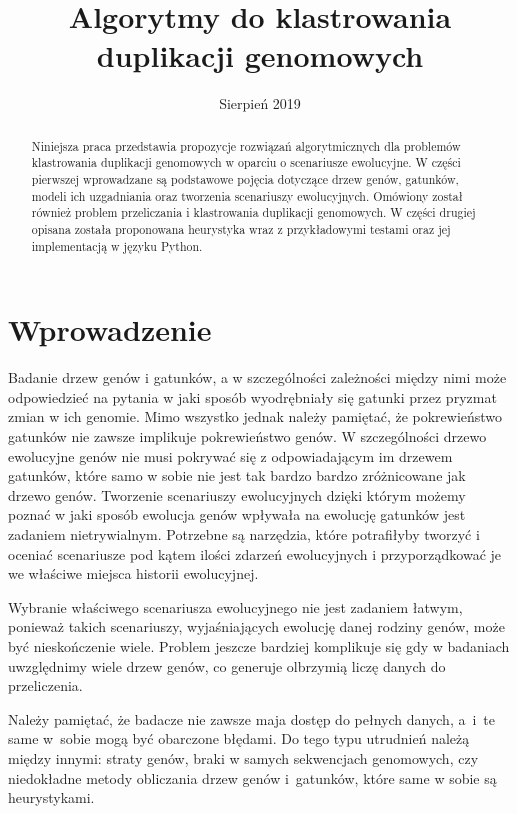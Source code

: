 \documentclass[licencjacka]{pracamgr}
\title{Algorytmy do klastrowania duplikacji genomowych}
\date{Sierpień 2019}
\begin{document}
\maketitle


\begin{abstract}
   Niniejsza praca przedstawia propozycje rozwiązań algorytmicznych dla problemów klastrowania duplikacji genomowych w oparciu o scenariusze ewolucyjne. W części pierwszej wprowadzane są podstawowe pojęcia dotyczące drzew genów, gatunków, modeli ich uzgadniania oraz tworzenia scenariuszy ewolucyjnych. Omówiony został również problem przeliczania i klastrowania duplikacji genomowych. W części drugiej opisana została proponowana heurystyka wraz z przykładowymi testami oraz jej implementacją w języku Python.
\end{abstract}


\renewcommand{\contentsname}{Spis Treści}
\tableofcontents

\chapter*{Wprowadzenie}


Badanie drzew genów i gatunków, a w szczególności zależności między nimi może odpowiedzieć na pytania w jaki sposób wyodrębniały się gatunki przez pryzmat zmian w ich genomie. Mimo wszystko jednak należy pamiętać, że pokrewieństwo gatunków nie zawsze implikuje pokrewieństwo genów. W szczególności drzewo ewolucyjne genów nie musi pokrywać się z odpowiadającym im drzewem gatunków, które samo w sobie nie jest tak bardzo bardzo zróżnicowane jak drzewo genów. Tworzenie scenariuszy ewolucyjnych dzięki którym możemy poznać w jaki sposób ewolucja genów wpływała na ewolucję gatunków jest zadaniem nietrywialnym. Potrzebne są narzędzia, które potrafiłyby tworzyć i oceniać scenariusze pod kątem ilości zdarzeń ewolucyjnych i przyporządkować je we właściwe miejsca historii ewolucyjnej.

Wybranie właściwego scenariusza ewolucyjnego nie jest zadaniem łatwym, ponieważ takich scenariuszy, wyjaśniających ewolucję danej rodziny genów, może być nieskończenie wiele. Problem jeszcze bardziej komplikuje się gdy w badaniach uwzględnimy wiele drzew genów, co generuje olbrzymią liczę danych do przeliczenia.

Należy pamiętać, że badacze nie zawsze maja dostęp do pełnych danych, a~i~te same w~sobie mogą być obarczone błędami. Do tego typu utrudnień należą między innymi: straty genów, braki w samych sekwencjach genomowych, czy niedokładne metody obliczania drzew genów i~gatunków, które same w sobie są heurystykami. 
\end{document}
